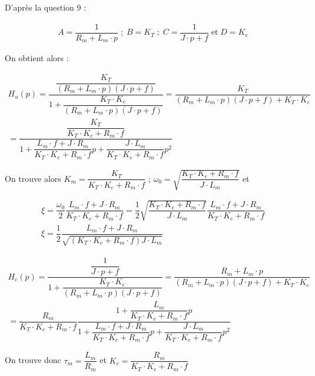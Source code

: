 
\begin{texteCache}
D'après la question 9 : 

\begin{align*}
A=\dfrac{1}{R_m+L_m\cdot p} \;;\; B=K_T\;;\;C=\dfrac{1}{J\cdot p+f}\;\text{et} \;D=K_e
\end{align*}

On obtient alors : 

\begin{align*}
H_u(p)=\dfrac{\dfrac{K_T}{\left(R_m+L_m\cdot p\right)\left(J\cdot p+f\right)}}{1+\dfrac{K_T\cdot K_e}{\left(R_m+L_m\cdot p\right)\left(J\cdot p+f\right)}}
=\dfrac{K_T}{\left(R_m+L_m\cdot p\right)\left(J\cdot p+f\right)+K_T\cdot K_e}\\
=\dfrac{\dfrac{K_T}{K_T\cdot K_e+R_m\cdot f}}{1+\dfrac{L_m\cdot f+J\cdot R_m}{K_T\cdot K_e+R_m\cdot f}p+\dfrac{J\cdot L_m}{K_T\cdot K_e+R_m\cdot f}p^2}
\end{align*}

On trouve alors $K_m=\dfrac{K_T}{K_T\cdot K_e+R_m\cdot f}$ ; $\omega_0=\sqrt{\dfrac{K_T\cdot K_e+R_m\cdot f}{J\cdot L_m}}$ et

\begin{align*}
\xi=\dfrac{\omega_0}{2}\dfrac{L_m\cdot f+J\cdot R_m}{K_T\cdot K_e+R_m\cdot f}=\dfrac{1}{2}\sqrt{\dfrac{K_T\cdot K_e+R_m\cdot f}{J\cdot L_m}}\dfrac{L_m\cdot f+J\cdot R_m}{K_T\cdot K_e+R_m\cdot f}\\
\xi=\dfrac{1}{2}\dfrac{L_m\cdot f+J\cdot R_m}{\sqrt{\left(K_T\cdot K_e+R_m\cdot f\right)J\cdot L_m}}
\end{align*}

\begin{align*}
H_c(p)=\dfrac{\dfrac{1}{J\cdot p+f}}{1+\dfrac{K_T\cdot K_e}{\left(R_m+L_m\cdot p\right)\left(J\cdot p+f\right)}}
=\dfrac{R_m+L_m\cdot p}{\left(R_m+L_m\cdot p\right)\left(J\cdot p+f\right)+K_T\cdot K_e}\\
=\dfrac{R_m}{K_T\cdot K_e+R_m\cdot f}\dfrac{1+\dfrac{L_m}{K_T\cdot K_e+R_m\cdot f}p}{1+\dfrac{L_m\cdot f+J\cdot R_m}{K_T\cdot K_e+R_m\cdot f}p+\dfrac{J\cdot L_m}{K_T\cdot K_e+R_m\cdot f}p^2}
\end{align*}

On trouve donc $\tau_m=\dfrac{L_m}{R_m}$ et $K_c=\dfrac{R_m}{K_T\cdot K_e+R_m\cdot f}$


\end{texteCache}

